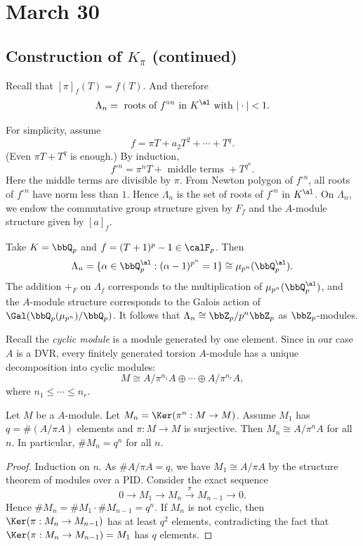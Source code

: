 \section{March 30}


\subsection[Construction of K\_pi]{Construction of $K_\pi$ (continued)}

  \begin{remark}
    Recall that $[\pi]_f(T) = f(T)$.
    And therefore 
    \[ \Lambda_n = \text{ roots of } f^{\circ n} \text{ in } K^\al \text{ with } |\cdot | < 1. \]
  \end{remark}

  For simplicity, assume 
  \[ f = \pi T + a_2 T^2 + \cdots + T^q. \]
  (Even $\pi T + T^q$ is enough.)
  By induction, 
  \[ f^{\circ n} = \pi^n T + \text{ middle terms } + T^{q^n}. \]
  Here the middle terms are divisible by $\pi$.
  From Newton polygon of $f^{\circ n}$, all roots of $f^{\circ n}$ have norm less than $1$.
  Hence $\Lambda_n$ is the set of roots of $f^{\circ n}$ in $K^\al$.
  On $\Lambda_n$, we endow the commutative group structure given by $F_f$ and the $A$-module structure given by $[a]_f$.

  \begin{example}
    Take $K = \bbQ_p$ and $f = (T+1)^p - 1 \in \calF_p$.
    Then 
    \[ \Lambda_n = \{ \alpha \in \bbQ_p^\al : (\alpha - 1)^{p^n} = 1 \} \cong \mu_{p^n}(\bbQ_p^\al). \]
    The addition $+_F$ on $\Lambda_f$ corresponds to the multiplication of $\mu_{p^n}(\bbQ_p^\al)$, and the $A$-module structure corresponds to the Galois action of $\Gal(\bbQ_p(\mu_{p^n})/\bbQ_p)$.
    It follows that $\Lambda_n \cong \bbZ_p / p^n \bbZ_p$ as $\bbZ_p$-modules.
  \end{example}

  Recall the \emph{cyclic module} is a module generated by one element.
  Since in our case $A$ is a DVR, every finitely generated torsion $A$-module has a unique decomposition into cyclic modules:
  \[ M \cong A / \pi^{n_1} A \oplus \cdots \oplus A / \pi^{n_r} A, \]
  where $n_1 \leq \cdots \leq n_r$.

  \begin{lemma}\label{lem:criterion_of_cyclic_module}
    Let $M$ be a $A$-module.
    Let $M_n = \Ker (\pi^n : M \to M)$.
    Assume $M_1$ has $q = \#(A/\pi A)$ elements and $\pi: M \to M$ is surjective.
    Then $M_n \cong A / \pi^n A$ for all $n$.
    In particular, $\# M_n = q^n$ for all $n$.
  \end{lemma}
  \begin{proof}
    Induction on $n$.
    As $\# A / \pi A = q$, we have $M_1 \cong A / \pi A$ by the structure theorem of modules over a PID.
    Consider the exact sequence
    \[ 0 \to M_1 \to M_n \xrightarrow{\pi} M_{n-1} \to 0. \]
    Hence $\# M_n = \# M_1 \cdot \# M_{n-1} = q^n$.
    If $M_n$ is not cyclic, then $\Ker (\pi : M_n \to M_{n-1})$ has at least $q^2$ elements, contradicting the fact that $\Ker (\pi : M_n \to M_{n-1}) = M_1$ has $q$ elements.
  \end{proof}

